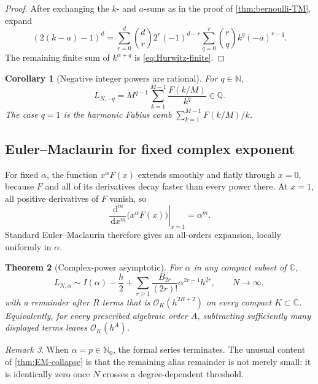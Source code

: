\documentclass[11pt,oneside]{article}
\numberwithin{equation}{section}
\newtheorem{theorem}{Theorem}[section]
\newtheorem{corollary}[theorem]{Corollary}
\theoremstyle{definition}
\theoremstyle{remark}
\newtheorem{remark}[theorem]{Remark}
\newcommand{\C}{\mathbb C}
\newcommand{\Q}{\mathbb Q}
\newcommand{\N}{\mathbb N}
\newcommand{\dd}{\,\mathrm d}
\newcommand{\bigO}{\mathcal O}
\newcommand{\fall}[2]{#1^{\underline{#2}}}
\begin{document}
\begin{proof}
After exchanging the \(k\)- and \(a\)-sums as in the proof of
\cref{thm:bernoulli-TM}, expand
\[
 (2(k-a)-1)^d
 =\sum_{r=0}^{d}\binom dr2^r(-1)^{d-r}
 \sum_{q=0}^{r}\binom rqk^q(-a)^{r-q}.
\]
The remaining finite sum of \(k^{\alpha+q}\) is \eqref{eq:Hurwitz-finite}.
\end{proof}

\begin{corollary}[Negative integer powers are rational]
\label{cor:negative-rational}
For \(q\in\N\),
\begin{equation}
 \boxed{\displaystyle
 L_{N,-q}=M^{q-1}\sum_{k=1}^{M-1}
 \frac{F(k/M)}{k^q}\in\Q.}
 \label{eq:negative-rational}
\end{equation}
The case \(q=1\) is the harmonic Fabius comb
\(
 \sum_{k=1}^{M-1}F(k/M)/k
\).
\end{corollary}

\subsection{Euler--Maclaurin for fixed complex exponent}

For fixed \(\alpha\), the function \(x^\alpha F(x)\) extends smoothly and flatly through
\(x=0\), because \(F\) and all of its derivatives decay faster than every power there.
At \(x=1\), all positive derivatives of \(F\) vanish, so
\begin{equation}
 \left.\frac{\dd^m}{\dd x^m}\bigl(x^\alpha F(x)\bigr)\right|_{x=1}
 =\fall\alpha m.
 \label{eq:endpoint-derivative-alpha}
\end{equation}
Standard Euler--Maclaurin therefore gives an all-orders expansion, locally uniformly in
\(\alpha\).

\begin{theorem}[Complex-power asymptotic]
\label{thm:complex-EM}
For \(\alpha\) in any compact subset of \(\C\),
\begin{equation}
 \boxed{\displaystyle
 L_{N,\alpha}\sim I(\alpha)-\frac h2+
 \sum_{r\ge1}\frac{B_{2r}}{(2r)!}
 \fall\alpha{2r-1}h^{2r},
 \qquad N\to\infty,}
 \label{eq:complex-EM}
\end{equation}
with a remainder after \(R\) terms that is \(\bigO_K(h^{2R+2})\) on every compact
\(K\subset\C\).  Equivalently, for every prescribed algebraic order \(A\), subtracting
sufficiently many displayed terms leaves \(\bigO_K(h^A)\).
\end{theorem}

\begin{remark}
When \(\alpha=p\in\N_0\), the formal series terminates.  The unusual content of
\cref{thm:EM-collapse} is that the remaining alias remainder is not merely small: it is
identically zero once \(N\) crosses a degree-dependent threshold.
\end{remark}
\end{document}
